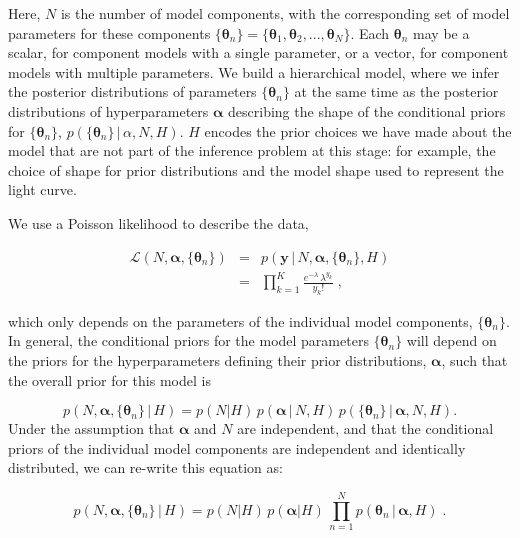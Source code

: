 \documentclass[12pt]{emulateapj}
\newcommand{\given}{\,|\,}
\newcommand{\counts}{y}
\newcommand{\likelihood}{{\mathcal L}}
\begin{document}
Here, $N$ is the number of model components, with the corresponding set of model parameters for these components $\{\bm{\theta}_n\} = \{ \bm{\theta}_1, \bm{\theta}_2, ..., \bm{\theta}_N \}$. Each $\bm{\theta}_n$ may be a scalar, for component models with a single parameter, or a vector, for component models with multiple parameters. 
We build a hierarchical model, where we infer the posterior distributions of parameters $\{\bm{\theta}_n\}$ at the same time as the posterior distributions of hyperparameters $\bm{\alpha}$ describing the shape
of the conditional priors for  $\{\bm{\theta}_n\}$, $p(\{\bm{\theta}_n\}\given \alpha, N, H)$.
$H$ encodes the prior choices we have
made about the model that are not part of the inference problem at this stage: for example, the choice of shape for prior distributions and the model shape used to represent the light curve.

We use a Poisson likelihood to describe the data,

\begin{eqnarray}
\likelihood(N, \bm{\alpha}, \{\bm{\theta}_n \}) & = & p(\bm{\counts} \given N, \bm{\alpha}, \{\bm{\theta}_n \}, H) \\ \nonumber
 &= & \prod\limits_{k=1}^{K}{ \frac{e^{-\lambda}\, \lambda^{y_k} }{y_k! }} \; ,
\end{eqnarray}

which only depends on the parameters of the individual model components, $\{\bm{\theta}_n\}$. In general, the conditional priors for the model 
parameters $\{\bm{\theta}_n\}$ will depend on the priors for the hyperparameters defining their prior distributions, $\bm{\alpha}$, such that the
overall prior for this model is

\begin{equation}
p(N, \bm{\alpha}, \{\bm{\theta}_n \} \given H) = p(N | H)\,p(\bm{\alpha}\given N, H)\,p(\{\bm{\theta}_n\}\given \bm{\alpha}, N, H)  .
\end{equation}
Under the assumption that $\bm{\alpha}$ and $N$ are independent, and that the conditional priors of the individual model components are
independent and identically distributed, we can re-write this equation as:

\begin{equation}
p(N, \bm{\alpha}, \{\bm{\theta}_n \} \given H) = p(N|H)\, p(\bm{\alpha}|H)\, \prod\limits_{n=1}^{N}  p(\bm{\theta}_n\given \bm{\alpha}, H) \; .
\end{equation}
\end{document}
